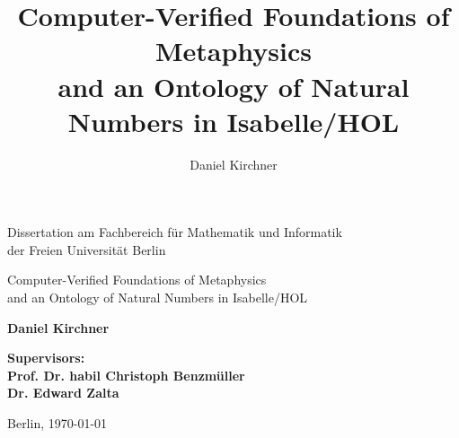 \documentclass[a4paper,enabledeprecatedfontcommands,abstract=on,twoside=true]{scrreprt}
\title{Computer-Verified Foundations of Metaphysics\\ and an Ontology of Natural Numbers in Isabelle/HOL}
\author{Daniel Kirchner}
\numberwithin{TODO}{chapter}
\numberwithin{equation}{section}
\begin{document}
\begin{titlepage}
\vspace{1cm}

\begin{center}
    \vspace{1cm}


Dissertation am Fachbereich für Mathematik und Informatik\\ der Freien Universität Berlin

    \vspace{2cm}


    \Large{\textsf{Computer-Verified Foundations of Metaphysics\\ and an Ontology of Natural Numbers in Isabelle/HOL}}

    \vspace{2cm}

    \large{\textbf{Daniel Kirchner}}

    \vspace{2cm}

    \large{\textbf{
        Supervisors:\\
Prof. Dr. habil Christoph Benzm\"uller\\
Dr. Edward Zalta
    }}

    \vspace{2cm}
    \large{Berlin, \today}
\end{center}
\end{titlepage}

\cleardoublepage
\end{document}
